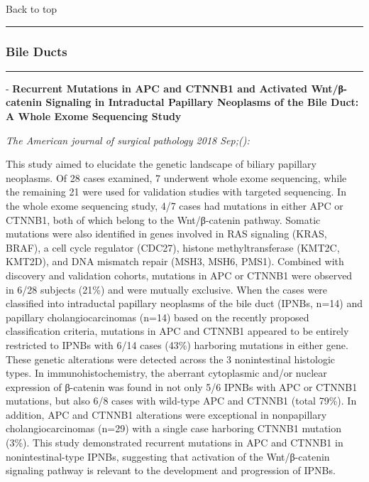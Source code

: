 \documentclass[]{article}
\begin{document}
Back to top

\begin{center}\rule{0.5\linewidth}{\linethickness}\end{center}

\pagebreak

\hypertarget{bile-ducts-2}{%
\subsubsection{Bile Ducts}\label{bile-ducts-2}}

\begin{center}\rule{0.5\linewidth}{\linethickness}\end{center}

 - \textbf{Recurrent Mutations in APC and CTNNB1 and Activated
Wnt/β-catenin Signaling in Intraductal Papillary Neoplasms of the Bile
Duct: A Whole Exome Sequencing Study}

\emph{The American journal of surgical pathology 2018 Sep;():}

This study aimed to elucidate the genetic landscape of biliary papillary
neoplasms. Of 28 cases examined, 7 underwent whole exome sequencing,
while the remaining 21 were used for validation studies with targeted
sequencing. In the whole exome sequencing study, 4/7 cases had mutations
in either APC or CTNNB1, both of which belong to the Wnt/β-catenin
pathway. Somatic mutations were also identified in genes involved in RAS
signaling (KRAS, BRAF), a cell cycle regulator (CDC27), histone
methyltransferase (KMT2C, KMT2D), and DNA mismatch repair (MSH3, MSH6,
PMS1). Combined with discovery and validation cohorts, mutations in APC
or CTNNB1 were observed in 6/28 subjects (21\%) and were mutually
exclusive. When the cases were classified into intraductal papillary
neoplasms of the bile duct (IPNBs, n=14) and papillary
cholangiocarcinomas (n=14) based on the recently proposed classification
criteria, mutations in APC and CTNNB1 appeared to be entirely restricted
to IPNBs with 6/14 cases (43\%) harboring mutations in either gene.
These genetic alterations were detected across the 3 nonintestinal
histologic types. In immunohistochemistry, the aberrant cytoplasmic
and/or nuclear expression of β-catenin was found in not only 5/6 IPNBs
with APC or CTNNB1 mutations, but also 6/8 cases with wild-type APC and
CTNNB1 (total 79\%). In addition, APC and CTNNB1 alterations were
exceptional in nonpapillary cholangiocarcinomas (n=29) with a single
case harboring CTNNB1 mutation (3\%). This study demonstrated recurrent
mutations in APC and CTNNB1 in nonintestinal-type IPNBs, suggesting that
activation of the Wnt/β-catenin signaling pathway is relevant to the
development and progression of IPNBs.
\end{document}
